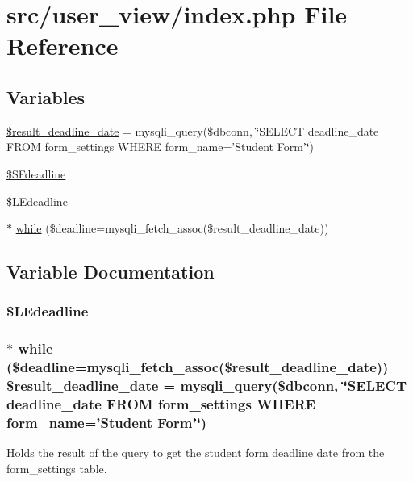 \hypertarget{user__view_2index_8php}{\section{src/user\-\_\-view/index.php \-File \-Reference}
\label{user__view_2index_8php}
}
\subsection*{\-Variables}
\begin{DoxyCompactItemize}
\item 
\hyperlink{user__view_2index_8php_a90edae4400be55d0694d788b51d0da5b}{\$result\-\_\-deadline\-\_\-date} = mysqli\-\_\-query(\$dbconn, \char`\"{}\-S\-E\-L\-E\-C\-T deadline\-\_\-date \-F\-R\-O\-M form\-\_\-settings \-W\-H\-E\-R\-E form\-\_\-name='\-Student \-Form'\char`\"{})
\item 
\hyperlink{user__view_2index_8php_a63601fc31b0f0ebad01c582a39f7c946}{\$\-S\-Fdeadline}
\item 
\hyperlink{user__view_2index_8php_ab6df47053fd5f065cf01b5c626fe9730}{\$\-L\-Edeadline}
\item 
$\ast$ \hyperlink{user__view_2index_8php_a2a213019ea4973a06bcd525b4fd4ab82}{while} (\$deadline=mysqli\-\_\-fetch\-\_\-assoc(\$result\-\_\-deadline\-\_\-date))
\end{DoxyCompactItemize}


\subsection{\-Variable \-Documentation}
\hypertarget{user__view_2index_8php_ab6df47053fd5f065cf01b5c626fe9730}{
\subsubsection[{\$\-L\-Edeadline}]{\setlength{\rightskip}{0pt plus 5cm}\$\-L\-Edeadline}}\label{user__view_2index_8php_ab6df47053fd5f065cf01b5c626fe9730}
\hypertarget{user__view_2index_8php_a90edae4400be55d0694d788b51d0da5b}{
\subsubsection[{\$result\-\_\-deadline\-\_\-date}]{\setlength{\rightskip}{0pt plus 5cm}$\ast$ {\bf while} (\$deadline=mysqli\-\_\-fetch\-\_\-assoc(\$result\-\_\-deadline\-\_\-date)) \$result\-\_\-deadline\-\_\-date = mysqli\-\_\-query(\$dbconn, \char`\"{}\-S\-E\-L\-E\-C\-T deadline\-\_\-date \-F\-R\-O\-M form\-\_\-settings \-W\-H\-E\-R\-E form\-\_\-name='\-Student \-Form'\char`\"{})}}\label{user__view_2index_8php_a90edae4400be55d0694d788b51d0da5b}
\-Holds the result of the query to get the student form deadline date from the form\-\_\-settings table.

